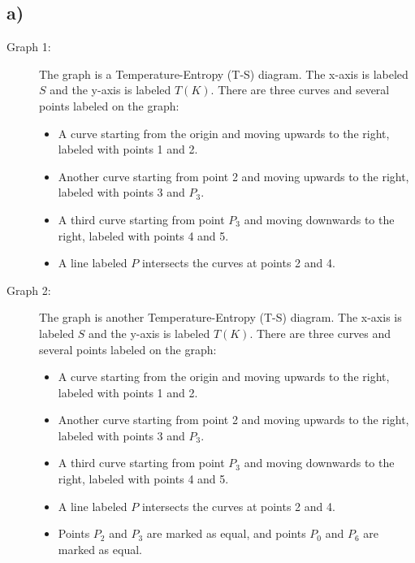 

\subsection*{a)}

\begin{description}
    \item[Graph 1:] The graph is a Temperature-Entropy (T-S) diagram. The x-axis is labeled $S$ and the y-axis is labeled $T(K)$. There are three curves and several points labeled on the graph:
    \begin{itemize}
        \item A curve starting from the origin and moving upwards to the right, labeled with points 1 and 2.
        \item Another curve starting from point 2 and moving upwards to the right, labeled with points 3 and $P_3$.
        \item A third curve starting from point $P_3$ and moving downwards to the right, labeled with points 4 and 5.
        \item A line labeled $P$ intersects the curves at points 2 and 4.
    \end{itemize}
    \item[Graph 2:] The graph is another Temperature-Entropy (T-S) diagram. The x-axis is labeled $S$ and the y-axis is labeled $T(K)$. There are three curves and several points labeled on the graph:
    \begin{itemize}
        \item A curve starting from the origin and moving upwards to the right, labeled with points 1 and 2.
        \item Another curve starting from point 2 and moving upwards to the right, labeled with points 3 and $P_3$.
        \item A third curve starting from point $P_3$ and moving downwards to the right, labeled with points 4 and 5.
        \item A line labeled $P$ intersects the curves at points 2 and 4.
        \item Points $P_2$ and $P_3$ are marked as equal, and points $P_0$ and $P_6$ are marked as equal.
    \end{itemize}
\end{description}